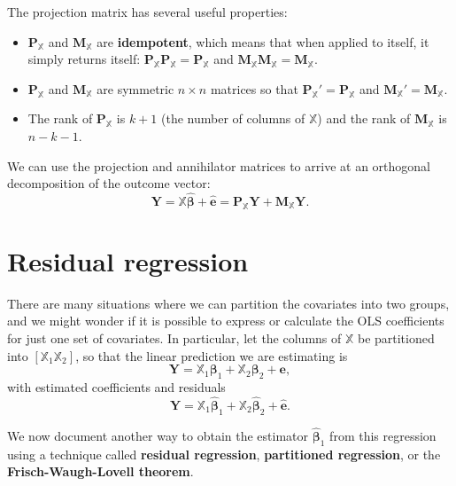 \documentclass[
  13pt,
  letterpaper,
  DIV=11,
  numbers=noendperiod]{scrreprt}
\newcommand{\mb}{\symbf}
\newcommand{\Xmat}{\mathbb{X}}
\newcommand{\bfbeta}{\mb{\beta}}
\newcommand{\bhat}{\widehat{\mb{\beta}}}
\theoremstyle{plain}
\theoremstyle{definition}
\theoremstyle{definition}
\theoremstyle{remark}
\begin{document}
The projection matrix has several useful properties:

\begin{itemize}
\item
  \(\mb{P}_{\Xmat}\) and \(\mb{M}_{\Xmat}\) are \textbf{idempotent},
  which means that when applied to itself, it simply returns itself:
  \(\mb{P}_{\Xmat}\mb{P}_{\Xmat} = \mb{P}_{\Xmat}\) and
  \(\mb{M}_{\Xmat}\mb{M}_{\Xmat} = \mb{M}_{\Xmat}\).
\item
  \(\mb{P}_{\Xmat}\) and \(\mb{M}_{\Xmat}\) are symmetric \(n \times n\)
  matrices so that \(\mb{P}_{\Xmat}' = \mb{P}_{\Xmat}\) and
  \(\mb{M}_{\Xmat}' = \mb{M}_{\Xmat}\).
\item
  The rank of \(\mb{P}_{\Xmat}\) is \(k+1\) (the number of columns of
  \(\Xmat\)) and the rank of \(\mb{M}_{\Xmat}\) is \(n - k - 1\).
\end{itemize}

We can use the projection and annihilator matrices to arrive at an
orthogonal decomposition of the outcome vector: \[ 
\mb{Y} = \Xmat\bhat + \widehat{\mb{e}} = \mb{P}_{\Xmat}\mb{Y} + \mb{M}_{\Xmat}\mb{Y}.
\]

\section{Residual regression}\label{residual-regression}

There are many situations where we can partition the covariates into two
groups, and we might wonder if it is possible to express or calculate
the OLS coefficients for just one set of covariates. In particular, let
the columns of \(\Xmat\) be partitioned into \([\Xmat_{1} \Xmat_{2}]\),
so that the linear prediction we are estimating is \[ 
\mb{Y} = \Xmat_{1}\bfbeta_{1} + \Xmat_{2}\bfbeta_{2} + \mb{e}, 
\] with estimated coefficients and residuals \[ 
\mb{Y} = \Xmat_{1}\bhat_{1} + \Xmat_{2}\bhat_{2} + \widehat{\mb{e}}.
\]

We now document another way to obtain the estimator \(\bhat_1\) from
this regression using a technique called \textbf{residual regression},
\textbf{partitioned regression}, or the \textbf{Frisch-Waugh-Lovell
theorem}.
\end{document}
